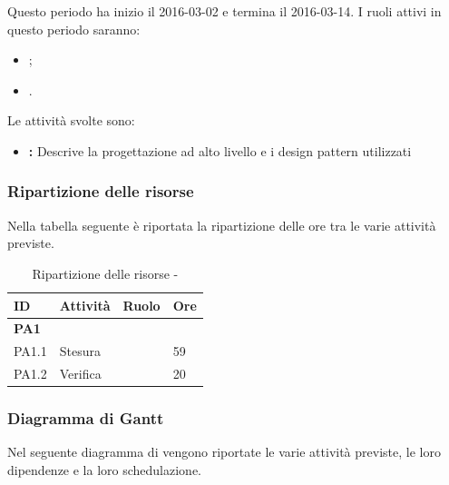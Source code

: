 \documentclass[12pt,a4paper]{article}
\begin{document}
Questo periodo ha inizio il 2016-03-02 e termina il 2016-03-14. 
I ruoli attivi in questo periodo saranno:

\begin{itemize}
	\item \PR{};
	\item \VR{}.
\end{itemize}

Le attività svolte sono:

\begin{itemize}
	\item \textbf{\ST{}:}
	Descrive la progettazione ad alto livello e i design pattern utilizzati
\end{itemize}

\subsubsection{Ripartizione delle risorse}
Nella tabella seguente è riportata la ripartizione delle ore tra le varie attività previste.

\begin{table}[H]
	\begin{center}
		\begin{tabular}{p{} p{} p{} p{}}
			\toprule
			\textbf{ID}	& \textbf{Attività}	& \textbf{Ruolo} & \textbf{Ore}\\ \midrule
			\midrule
			\textbf{PA1} & \textbf{\ST{}} & &  \\ \midrule
			PA1.1 & Stesura & \PG{} & 59 \\ \midrule
			PA1.2 & Verifica & \VR{} & 20 \\ \midrule
			\bottomrule
		\end{tabular}
		\caption{Ripartizione delle risorse - \FPA{}}
	\end{center}
\end{table}

\subsubsection{Diagramma di Gantt}\label{gantt progettazione}
Nel seguente diagramma di  vengono riportate le varie attività previste, le loro dipendenze e la loro schedulazione.
\end{document}
